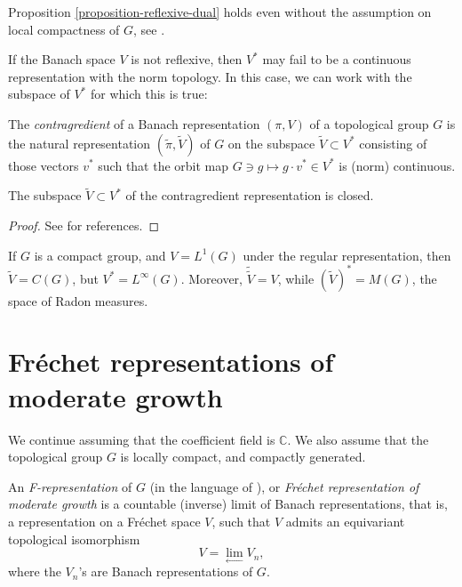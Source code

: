 \begin{remark}
\label{remark-dualcontinuous-withoutcompactness}
 Proposition  \ref{proposition-reflexive-dual}
 holds even without the assumption on local compactness of $G$, see \cite[Corollary 6.9]{Megrelishvili}.
\end{remark}

If the Banach space $V$ is not reflexive, then $V^*$ may fail to be a continuous representation with the norm topology. In this case, we can work with the subspace of $V^*$ for which this is true:

\begin{definition}
 \label{definition-contragredient}
The {\it contragredient} of a Banach representation $(\pi, V)$ of a topological group $G$ is the natural representation $(\tilde\pi, \tilde V)$ of $G$ on the subspace $\tilde V\subset V^*$ consisting of those vectors $v^*$ such that the orbit map $G\ni g\mapsto g\cdot v^* \in V^*$ is (norm) continuous. 
\end{definition}


\begin{lemma}
 \label{lemma-contragredient}
The subspace $\tilde V\subset V^*$ of the contragredient representation is closed. 
\end{lemma}

\begin{proof}
 See \cite[\S 3.1]{Bernstein-Kroetz} for references. 
\end{proof}

\begin{example}
 \label{example-contragredient}
If $G$ is a compact group, and $V=L^1(G)$ under the regular representation, then $\tilde V = C(G)$, but $V^*=L^\infty(G)$. Moreover, $\tilde{\tilde V} = V$, while $(\tilde V)^* = M(G)$, the space of Radon measures.
\end{example}





\section{Fr\'echet representations of moderate growth}
\label{section-Frepresentations}

We continue assuming that the coefficient field is $\mathbb C$. We also assume that the topological group $G$ is locally compact, and compactly generated. 

\begin{definition}
\label{definition-Frepresentation}
An {\it F-representation} of $G$ (in the language of 
\cite{Bernstein-Kroetz}), or {\it Fr\'echet representation of moderate growth}
is a countable (inverse) limit of Banach representations, that is, a representation on a Fr\'echet space $V$, such that $V$ admits an equivariant topological isomorphism 
$$ 
V = \lim_{\leftarrow} V_n,
$$
where the $V_n$'s are Banach representations of $G$.
\end{definition}
 
